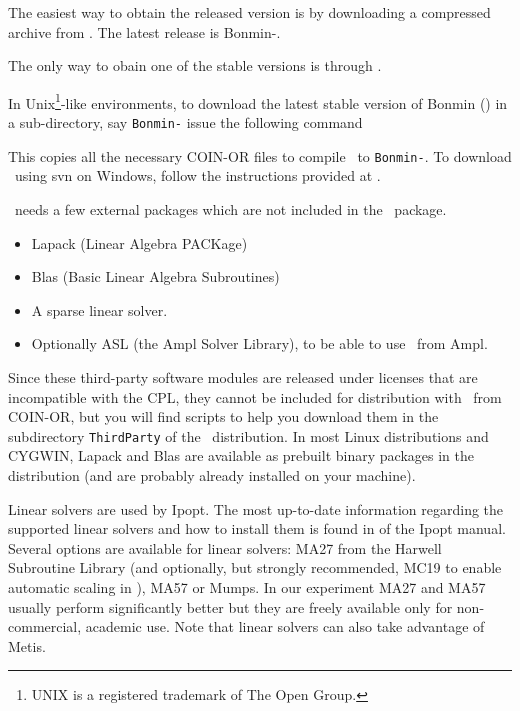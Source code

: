 The easiest way to obtain the released version is by downloading a compressed archive from . The latest release is Bonmin-\releaseVersion.

The only way to obain one of the stable versions is through .

In Unix\footnote{UNIX is a registered trademark of The Open
Group.}-like environments, to download the latest stable version of Bonmin (\stableVersion) in a sub-directory, say {\tt Bonmin-\stableVersion} 
issue the following command
\break

\begin{colorverb}
\end{colorverb}

\noindent This copies all the necessary COIN-OR files to compile \Bonmin\ to
{\tt Bonmin-\stableVersion}. To download \Bonmin\ using svn on Windows,
follow the instructions provided at
.

\Bonmin\ needs a few external packages which are not included in the \Bonmin\ package.
\begin{itemize}
\item Lapack (Linear Algebra PACKage)
\item Blas (Basic Linear Algebra Subroutines)
\item A sparse linear solver.
\item Optionally ASL (the Ampl Solver Library), to be able to use \Bonmin\ from Ampl.
\end{itemize}


Since these third-party software modules are released under licenses
that are incompatible with the CPL, they cannot be included for
distribution with \Bonmin\ from COIN-OR, but you will find scripts
to help you download them in the subdirectory {\tt ThirdParty} of
the \Bonmin\ distribution. In most Linux distributions and
CYGWIN, Lapack and Blas are available as prebuilt binary packages in
the distribution (and are probably already installed on your
machine). 

Linear solvers are used by Ipopt. The most up-to-date information regarding the supported linear solvers and how to install them is found in  of the Ipopt manual.\\

Several options are available for linear solvers: MA27 from the Harwell Subroutine Library (and optionally, but strongly recommended, MC19 to enable automatic scaling in \Ipopt), MA57 or Mumps.
In our experiment MA27 and MA57 usually perform significantly better but they are freely 
available only for non-commercial, academic use. Note that linear solvers can also take advantage of Metis.
